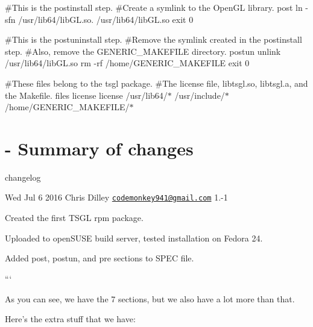 \#\-This is the postinstall step. \#\-Create a symlink to the Open\-G\-L library. post ln -\/sfn /usr/lib64/lib\-G\-L.so. /usr/lib64/lib\-G\-L.so exit 0

\#\-This is the postuninstall step. \#\-Remove the symlink created in the postinstall step. \#\-Also, remove the G\-E\-N\-E\-R\-I\-C\-\_\-\-M\-A\-K\-E\-F\-I\-L\-E directory. postun unlink /usr/lib64/lib\-G\-L.so rm -\/rf /home/\-G\-E\-N\-E\-R\-I\-C\-\_\-\-M\-A\-K\-E\-F\-I\-L\-E exit 0

\#\-These files belong to the tsgl package. \#\-The license file, libtsgl.\-so, libtsgl.\-a, and the Makefile. files license license /usr/lib64/$\ast$ /usr/include/$\ast$ /home/\-G\-E\-N\-E\-R\-I\-C\-\_\-\-M\-A\-K\-E\-F\-I\-L\-E/$\ast$

\section*{-\/ Summary of changes}

changelog
\begin{DoxyItemize}
\item Wed Jul 6 2016 Chris Dilley \href{mailto:codemonkey941@gmail.com}{\tt codemonkey941@gmail.\-com} 1.-\/1
\item Created the first T\-S\-G\-L rpm package.
\item Uploaded to open\-S\-U\-S\-E build server, tested installation on Fedora 24.
\item Added post, postun, and pre sections to S\-P\-E\-C file.
\end{DoxyItemize}

```

As you can see, we have the 7 sections, but we also have a lot more than that.

Here's the extra stuff that we have\-:


